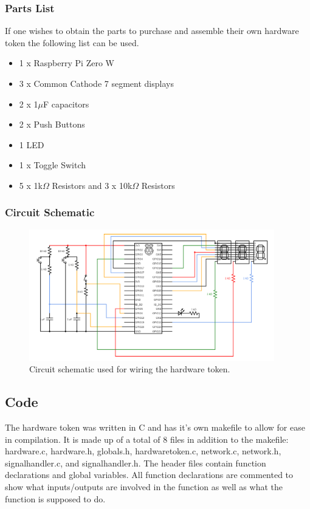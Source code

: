\documentclass[a4paper,10pt]{article}
\begin{document}
\subsubsection{Parts List}
If one wishes to obtain the parts to purchase and assemble their own hardware token the following list can be used.
\begin{itemize}
\item 1 x Raspberry Pi Zero W
\item 3 x Common Cathode 7 segment displays
\item 2 x 1$\mu$F capacitors
\item 2 x Push Buttons
\item 1 LED
\item 1 x Toggle Switch
\item 5 x 1k$\Omega$ Resistors and 3 x 10k$\Omega$ Resistors
\end{itemize}

\subsubsection{Circuit Schematic}

\begin{figure}[H]
  \centering
      \includegraphics[width=0.95\textwidth]{Assets/circuit.png}
  \caption{Circuit schematic used for wiring the hardware token.}
\end{figure}

\subsection{Code}
The hardware token was written in C and has it's own makefile to allow for ease in compilation. It is made up of a total of 8 files in addition to the makefile: hardware.c, hardware.h, globals.h, hardware\textunderscore token.c, network.c, network.h, signal\textunderscore handler.c, and signal\textunderscore handler.h. The header files contain function declarations and global variables. All function declarations are commented to show what inputs/outputs are involved in the function as well as what the function is supposed to do.
\end{document}
